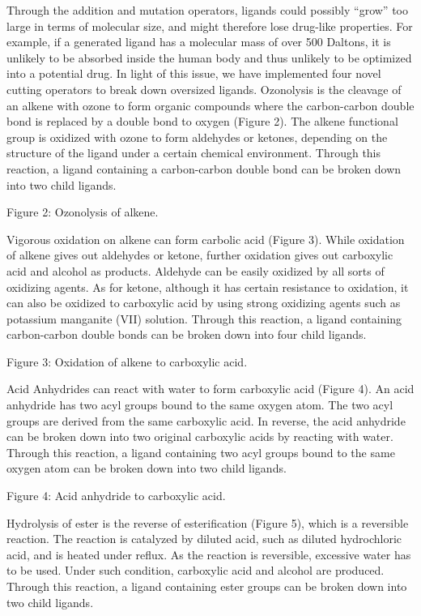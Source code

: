 Through the addition and mutation operators, ligands could possibly “grow” too large in terms of molecular size, and might therefore lose drug-like properties. For example, if a generated ligand has a molecular mass of over 500 Daltons, it is unlikely to be absorbed inside the human body and thus unlikely to be optimized into a potential drug. In light of this issue, we have implemented four novel cutting operators to break down oversized ligands.
Ozonolysis is the cleavage of an alkene with ozone to form organic compounds where the carbon-carbon double bond is replaced by a double bond to oxygen (Figure 2). The alkene functional group is oxidized with ozone to form aldehydes or ketones, depending on the structure of the ligand under a certain chemical environment. Through this reaction, a ligand containing a carbon-carbon double bond can be broken down into two child ligands.
 
Figure 2: Ozonolysis of alkene.

Vigorous oxidation on alkene can form carbolic acid (Figure 3). While oxidation of alkene gives out aldehydes or ketone, further oxidation gives out carboxylic acid and alcohol as products. Aldehyde can be easily oxidized by all sorts of oxidizing agents. As for ketone, although it has certain resistance to oxidation, it can also be oxidized to carboxylic acid by using strong oxidizing agents such as potassium manganite (VII) solution. Through this reaction, a ligand containing carbon-carbon double bonds can be broken down into four child ligands.
 
Figure 3: Oxidation of alkene to carboxylic acid.

Acid Anhydrides can react with water to form carboxylic acid (Figure 4). An acid anhydride has two acyl groups bound to the same oxygen atom. The two acyl groups are derived from the same carboxylic acid. In reverse, the acid anhydride can be broken down into two original carboxylic acids by reacting with water. Through this reaction, a ligand containing two acyl groups bound to the same oxygen atom can be broken down into two child ligands.
 
Figure 4: Acid anhydride to carboxylic acid.

Hydrolysis of ester is the reverse of esterification (Figure 5), which is a reversible reaction. The reaction is catalyzed by diluted acid, such as diluted hydrochloric acid, and is heated under reflux. As the reaction is reversible, excessive water has to be used. Under such condition, carboxylic acid and alcohol are produced. Through this reaction, a ligand containing ester groups can be broken down into two child ligands.

